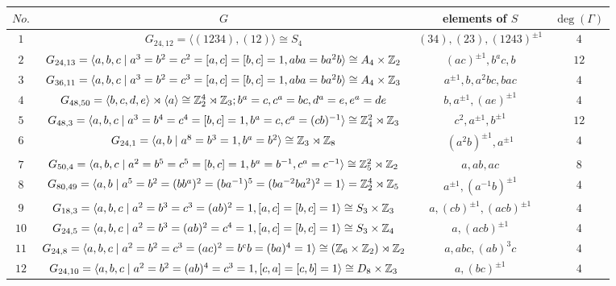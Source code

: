 \documentclass{amsart}
\begin{document}
	{\footnotesize
	\begin{table}
		\centering
		\begin{tabular}{|c|c|c|c|}
			\hline
			$No.$&$G$&elements of $S$& $\deg(\Gamma)$ \\ \hline
			$1$& $G_{24,12}=\langle (1234),(12)\rangle\cong S_{4}$&$(34), (23), (1243)^{\pm 1}$&$4$\\
			$2$&$G_{24,13}=\langle a,b,c\mid a^3=b^2=c^2=[a,c]=[b,c]=1, aba=ba^2b\rangle\cong A_4\times\Bbb Z_2$&$ (ac)^{\pm 1}, b^ac, b$&$12$\\
			$3$&$G_{36,11}=\langle a,b,c\mid a^3=b^2=c^3=[a,c]=[b,c]=1, aba=ba^2b\rangle\cong A_4\times\Bbb Z_3$&$a^{\pm 1}, b, a^2bc, bac$&$4$\\
			$4$& $G_{48,50}=\langle b,c,d,e\rangle\rtimes\langle a\rangle\cong\Bbb Z_2^4\rtimes\Bbb Z_3; b^a=c, c^a=bc,d^a=e,e^a=de$&$b,a^{\pm 1},(ae)^{\pm 1}$&$4$\\
			$5$& $G_{48,3}=\langle a,b,c\mid a^3=b^4=c^4=[b,c]=1, b^a=c, c^a=(cb)^{-1}\rangle\cong \Bbb Z_4^2\rtimes\Bbb Z_3$&$ c^2,a^{\pm 1}, b^{\pm 1}$&$12$\\
			$6$& $G_{24,1}=\langle a,b\mid a^8=b^3=1, b^a=b^2\rangle\cong\Bbb Z_3\rtimes\Bbb Z_8$&$(a^2b)^{\pm 1},a^{\pm 1}$&$4$\\
			$7$&$G_{50,4}=\langle a,b,c\mid a^2=b^5=c^5=[b,c]=1, b^a=b^{-1},c^a=c^{-1}\rangle\cong\Bbb Z_5^2\rtimes\Bbb Z_2$&$a,ab,ac$&$8$\\
			$8$& $G_{80,49}=\langle a,b\mid a^5=b^2=(bb^a)^2=(ba^{-1})^5=(ba^{-2}ba^2)^2=1 \rangle=\Bbb Z_2^4\rtimes\Bbb Z_5$&$ a^{\pm 1}, (a^{-1}b)^{\pm 1} $&$4$\\
			$9$&$G_{18,3}=\langle a,b,c\mid a^2=b^3=c^3=(ab)^2=1,[a,c]=[b,c]=1\rangle\cong S_3\times\Bbb Z_3$&$a, (cb)^{\pm 1}, (acb)^{\pm 1}$ &$4$\\ 
			$10$&$G_{24,5}=\langle a,b,c\mid a^2=b^3=(ab)^2=c^4=1, [a,c]=[b,c]=1\rangle\cong S_3\times\Bbb Z_4$& $a, (acb)^{\pm 1} $&4\\ 
			$11$&$G_{24,8}=\langle a,b,c\mid  a^2=b^2=c^3=(ac)^2=b^cb=(ba)^4=1\rangle\cong (\Bbb Z_6\times\Bbb Z_2)\rtimes\Bbb Z_2$&$ a, abc, (ab)^3c $&$4$\\ 
			$12$&$G_{24,10}=\langle a,b,c\mid a^2=b^2=(ab)^4=c^3=1,[c,a]=[c,b]=1\rangle\cong  D_8\times \Bbb Z_3 $ & $a, (bc)^{\pm 1} $&$4$\\ 

\end{tabular}
\end{table}}
\end{document}
